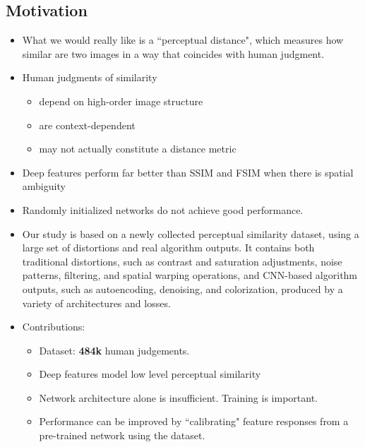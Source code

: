 \documentclass{article}
\begin{document}
    \subsection{Motivation}\label{subsec:The_Unreasonable_Effectiveness_of_Deep_Features_as_a_Perceptual_Metric:motivation}
    \begin{itemize}
        \item What we would really like is a ``perceptual distance", which measures how similar are two images in a way that coincides with human judgment.
        \item Human judgments of similarity
        \begin{itemize}
            \item depend on high-order image structure
            \item are context-dependent
            \item may not actually constitute a distance metric
        \end{itemize}
        \item Deep features perform far better than SSIM and FSIM when there is spatial ambiguity
        \item Randomly initialized networks do not achieve good performance.
        \item Our study is based on a newly collected perceptual similarity dataset, using a large set of distortions and real algorithm outputs.
        It contains both traditional distortions, such as contrast and saturation adjustments, noise patterns, filtering, and spatial warping operations, and CNN-based algorithm outputs, such as autoencoding, denoising, and colorization, produced by a variety of architectures and losses.
        \item Contributions:
        \begin{itemize}
            \item Dataset: \textbf{484k} human judgements.
            \item Deep features model low level perceptual similarity
            \item Network architecture alone is insufficient.
            Training is important.
            \item Performance can be improved by ``calibrating" feature responses from a pre-trained network using the dataset.
        \end{itemize}
    \end{itemize}
\end{document}
